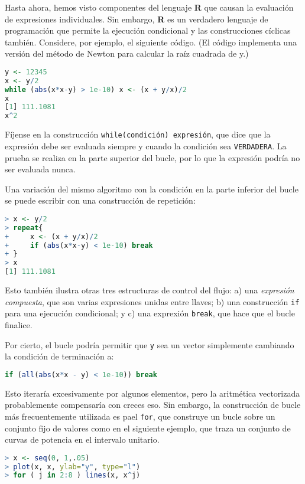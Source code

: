Hasta ahora, hemos visto componentes del lenguaje \textbf{R} que causan la
evaluación de expresiones individuales. Sin embargo, \textbf{R} es un verdadero
lenguaje de programación que permite la ejecución condicional y las
construcciones cíclicas también. Considere, por ejemplo, el siguiente código.
(El código implementa una versión del método de Newton para calcular la raíz
cuadrada de y.)

\begin{lstlisting}[language=R]
y <- 12345
x <- y/2
while (abs(x*x-y) > 1e-10) x <- (x + y/x)/2
x
[1] 111.1081
x^2
\end{lstlisting}

Fíjense en la construcción \texttt{while(condición) expresión}, que dice
que la expresión debe ser evaluada siempre y cuando la condición sea
\texttt{VERDADERA}. La prueba se realiza en la parte superior del bucle, por lo
que la expresión podría no ser evaluada nunca.

Una variación del mismo algoritmo con la condición en la parte inferior del
bucle se puede escribir con una construcción de repetición:

\begin{lstlisting}[language=R]
> x <- y/2
> repeat{
+     x <- (x + y/x)/2
+     if (abs(x*x-y) < 1e-10) break
+ }
> x
[1] 111.1081
\end{lstlisting}

Esto también ilustra otras tres estructuras de control del flujo: a) una
\textit{expresión compuesta}, que son varias expresiones unidas entre llaves; b)
una construcción \texttt{if} para una ejecución condicional; y c) una exprexión
\texttt{break}, que hace que el bucle finalice.

Por cierto, el bucle podría permitir que \texttt{y} sea un vector simplemente
cambiando la condición de terminación a:

\begin{lstlisting}[language=R]
if (all(abs(x*x - y) < 1e-10)) break
\end{lstlisting}

Esto iteraría excesivamente por algunos elementos, pero la aritmética
vectorizada probablemente compensaría con creces eso. Sin embargo, la
construcción de bucle más frecuentemente utilizada es pael \texttt{for}, que
construye un bucle sobre un conjunto fijo de valores como en el siguiente
ejemplo, que traza un conjunto de curvas de potencia en el intervalo unitario.

\begin{lstlisting}[language=R]
> x <- seq(0, 1,.05)
> plot(x, x, ylab="y", type="l")
> for ( j in 2:8 ) lines(x, x^j)
\end{lstlisting}

